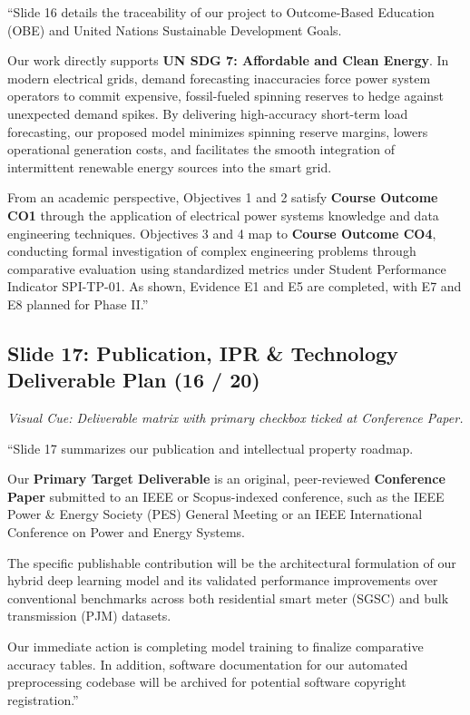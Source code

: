 \documentclass[11pt,a4paper]{article}
\begin{document}
\begin{scriptbox}
``Slide 16 details the traceability of our project to Outcome-Based Education (OBE) and United Nations Sustainable Development Goals.

Our work directly supports \textbf{UN SDG 7: Affordable and Clean Energy}. In modern electrical grids, demand forecasting inaccuracies force power system operators to commit expensive, fossil-fueled spinning reserves to hedge against unexpected demand spikes. By delivering high-accuracy short-term load forecasting, our proposed model minimizes spinning reserve margins, lowers operational generation costs, and facilitates the smooth integration of intermittent renewable energy sources into the smart grid.

From an academic perspective, Objectives 1 and 2 satisfy \textbf{Course Outcome CO1} through the application of electrical power systems knowledge and data engineering techniques. Objectives 3 and 4 map to \textbf{Course Outcome CO4}, conducting formal investigation of complex engineering problems through comparative evaluation using standardized metrics under Student Performance Indicator SPI-TP-01. As shown, Evidence E1 and E5 are completed, with E7 and E8 planned for Phase II.''
\end{scriptbox}

\subsection{Slide 17: Publication, IPR \& Technology Deliverable Plan (16 / 20)}
\textit{Visual Cue: Deliverable matrix with primary checkbox ticked at Conference Paper.}

\begin{scriptbox}
``Slide 17 summarizes our publication and intellectual property roadmap.

Our \textbf{Primary Target Deliverable} is an original, peer-reviewed \textbf{Conference Paper} submitted to an IEEE or Scopus-indexed conference, such as the IEEE Power \& Energy Society (PES) General Meeting or an IEEE International Conference on Power and Energy Systems.

The specific publishable contribution will be the architectural formulation of our hybrid deep learning model and its validated performance improvements over conventional benchmarks across both residential smart meter (SGSC) and bulk transmission (PJM) datasets.

Our immediate action is completing model training to finalize comparative accuracy tables. In addition, software documentation for our automated preprocessing codebase will be archived for potential software copyright registration.''
\end{scriptbox}
\end{document}
